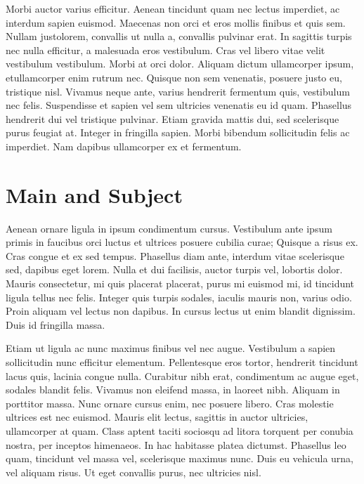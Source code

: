 \documentclass[12pt,a4paper]{article}
\begin{document}
Morbi auctor varius efficitur. Aenean tincidunt quam nec lectus imperdiet, ac interdum sapien euismod. Maecenas non orci et eros mollis finibus et quis sem. Nullam justo\pleasecite lorem, convallis ut nulla a, convallis pulvinar erat. In sagittis turpis nec nulla efficitur, a malesuada eros vestibulum. Cras vel libero vitae velit vestibulum vestibulum. Morbi at orci dolor. Aliquam dictum ullamcorper ipsum, et ullamcorper enim rutrum nec. Quisque non sem venenatis, posuere justo eu, tristique nisl. Vivamus neque ante, varius hendrerit fermentum quis, vestibulum nec felis. Suspendisse et sapien vel sem ultricies venenatis eu id quam. Phasellus hendrerit dui vel tristique pulvinar. Etiam gravida mattis dui, sed scelerisque purus feugiat at. Integer in fringilla sapien. Morbi bibendum sollicitudin felis ac imperdiet. Nam dapibus ullamcorper ex et fermentum.

\section{Main and Subject}


 Aenean ornare ligula in ipsum condimentum cursus. Vestibulum ante ipsum primis in faucibus orci luctus et ultrices posuere cubilia curae; Quisque a risus ex. Cras congue et ex sed tempus. Phasellus diam ante, interdum vitae scelerisque sed, dapibus eget lorem. Nulla et dui facilisis, auctor turpis vel, lobortis dolor. Mauris consectetur, mi quis placerat placerat, purus mi euismod mi, id tincidunt ligula tellus nec felis. Integer quis turpis sodales, iaculis mauris non, varius odio. Proin aliquam vel lectus non dapibus. In cursus lectus ut enim blandit dignissim. Duis id fringilla massa.

 Etiam ut ligula ac nunc maximus finibus vel nec augue. Vestibulum a sapien sollicitudin nunc efficitur elementum. Pellentesque eros tortor, hendrerit tincidunt lacus quis, lacinia congue nulla. Curabitur nibh erat, condimentum ac augue eget, sodales blandit felis. Vivamus non eleifend massa, in laoreet nibh. Aliquam in porttitor massa. Nunc ornare cursus enim, nec posuere libero. Cras molestie ultrices est nec euismod. Mauris elit lectus, sagittis in auctor ultricies, ullamcorper at quam. Class aptent taciti sociosqu ad litora torquent per conubia nostra, per inceptos himenaeos. In hac habitasse platea dictumst. Phasellus leo quam, tincidunt vel massa vel, scelerisque maximus nunc. Duis eu vehicula urna, vel aliquam risus. Ut eget convallis purus, nec ultricies nisl.
\end{document}
